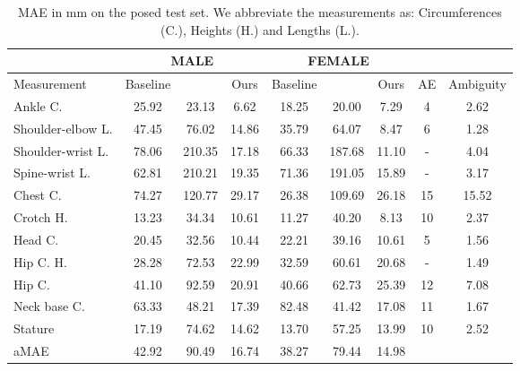 \begin{table}[t!]
\scriptsize
\begin{center}
\caption{MAE in mm on the posed test set. We abbreviate the measurements as: Circumferences (C.), Heights (H.) and Lengths (L.).}
\label{tab:caesar-posed-res}
\begin{tabular}{|l|c|c|c||c|c|c|c|c|}
\cline{2-7}
      \multicolumn{1}{c|}{} & \multicolumn{3}{c||}{MALE}       &      \multicolumn{3}{c|}{FEMALE}      &  \multicolumn{1}{c}{}  \\ \hline
Measurement          & Baseline & \cite{bojanic_VISAPP24} & Ours  & Baseline & \cite{bojanic_VISAPP24} & Ours  & AE \cite{AE} & Ambiguity \\ \hline
Ankle C.             & 25.92    & 23.13 & 6.62  & 18.25    & 20.00 & 7.29  & 4  &    2.62 \\
Shoulder-elbow L.    & 47.45    & 76.02 & 14.86  & 35.79    & 64.07 & 8.47  & 6  &    1.28 \\
Shoulder-wrist L.    & 78.06    & 210.35 & 17.18  & 66.33    & 187.68 & 11.10  & -   &   4.04 \\
Spine-wrist L.       & 62.81    & 210.21 & 19.35  & 71.36    & 191.05 & 15.89  & -   &   3.17 \\
Chest C.             & 74.27    & 120.77 & 29.17  & 26.38    & 109.69 & 26.18  & 15  &   15.52 \\
Crotch H.            & 13.23    & 34.34 & 10.61  & 11.27    & 40.20 & 8.13  & 10  &   2.37 \\
Head C.              & 20.45    & 32.56 & 10.44  & 22.21    & 39.16 & 10.61  & 5   &   1.56 \\
Hip C. H.            & 28.28    & 72.53 & 22.99  & 32.59    & 60.61 & 20.68  & -   &   1.49 \\
Hip C.               & 41.10    & 92.59 & 20.91  & 40.66    & 62.73 & 25.39  & 12  &   7.08 \\
Neck base C.         & 63.33    & 48.21 & 17.39  & 82.48    & 41.42 & 17.08  & 11  &    1.67 \\
Stature              & 17.19    & 74.62 & 14.62  & 13.70    & 57.25 & 13.99  & 10  &    2.52 \\ \hline \hline
aMAE                 & 42.92    & 90.49 & 16.74  & 38.27    & 79.44 & 14.98  &  \multicolumn{2}{c}{} \\ \cline{1-7}
\end{tabular}
\end{center}
\end{table}